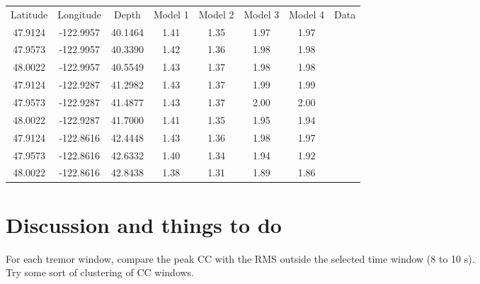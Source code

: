 \documentclass[main.tex]{subfiles}
\begin{document}
\begin{center}
\begin{tabular}{| c | c | c | c | c | c | c | c |}
  \hline
  Latitude & Longitude & Depth & Model 1 & Model 2 & Model 3 & Model 4 & Data \\
  47.9124 & -122.9957 & 40.1464 & 1.41 & 1.35 & 1.97 & 1.97 & \\
  47.9573 & -122.9957 & 40.3390 & 1.42 & 1.36 & 1.98 & 1.98 & \\
  48.0022 & -122.9957 & 40.5549 & 1.43 & 1.37 & 1.98 & 1.98 & \\
  47.9124 & -122.9287 & 41.2982 & 1.43 & 1.37 & 1.99 & 1.99 & \\
  47.9573 & -122.9287 & 41.4877 & 1.43 & 1.37 & 2.00 & 2.00 & \\
  48.0022 & -122.9287 & 41.7000 & 1.41 & 1.35 & 1.95 & 1.94 & \\
  47.9124 & -122.8616 & 42.4448 & 1.43 & 1.36 & 1.98 & 1.97 & \\
  47.9573 & -122.8616 & 42.6332 & 1.40 & 1.34 & 1.94 & 1.92 & \\
  48.0022 & -122.8616 & 42.8438 & 1.38 & 1.31 & 1.89 & 1.86 & \\
  \hline
\end{tabular}
\captionsetup{type=table}
\end{center}

\chapter{Discussion and things to do}

For each tremor window, compare the peak CC with the RMS outside the selected time window (8 to 10 s). \\

Try some sort of clustering of CC windows.
\end{document}
